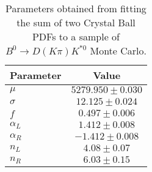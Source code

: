 \begin{table}[h]
  \centering
  \begin{tabular}{lc}
      \toprule
      Parameter & Value \\
      \midrule
      $\mu$ & $5279.950 \pm 0.030$ \\
      $\sigma$ & $12.125 \pm 0.024$ \\
      $f$ & $0.497 \pm 0.006$ \\
      $\alpha_L$ & $1.412 \pm 0.008$ \\
      $\alpha_R$ & $-1.412 \pm 0.008$ \\
      $n_L$ & $4.08 \pm 0.07$ \\
      $n_R$ & $6.03 \pm 0.15$ \\
  \bottomrule
  \end{tabular}
  \caption{Parameters obtained from fitting the sum of two Crystal Ball PDFs to a sample of $B^0 \to D(K\pi)K^{*0}$ Monte Carlo.}
\label{tab:signal_Kpi_MC_params}
\end{table}
